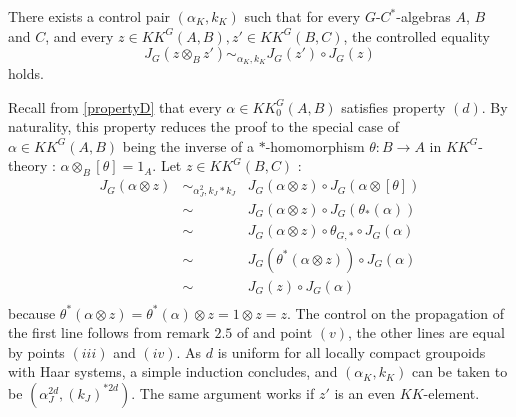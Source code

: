 \begin{prop} There exists a control pair $(\alpha_K,k_K)$ such that for every $G$-$C^*$-algebras $A$, $B$ and $C$, and every $z\in KK^G(A,B),z'\in KK^G(B,C)$, the controlled equality
\[J_G(z\otimes_B z') \sim_{\alpha_K,k_K} J_G(z')\circ J_G(z)\]
holds.
\end{prop}
\begin{dem}
Recall from \ref{propertyD} that every $\alpha\in KK_0^G(A,B)$ satisfies property $(d)$. By naturality, this property reduces the proof to the special case of $\alpha\in KK^G(A,B)$ being the inverse of a $*$-homomorphism $\theta : B\rightarrow A$ in $KK^G$-theory : $\alpha\otimes_B [\theta]=1_A$. Let $z\in KK^G(B,C)$ :
\[\begin{array}{rcl}
J_G (\alpha\otimes z) & \sim_{\alpha_J^2,k_J*k_J} &  J_G(\alpha\otimes z)\circ J_G(\alpha\otimes [\theta]) \\
			& \sim & J_G(\alpha\otimes z)\circ J_G(\theta_*(\alpha))\\
			& \sim & J_G(\alpha\otimes z)\circ \theta_{G,*}\circ J_G(\alpha)\\
			& \sim & J_G(\theta^*(\alpha\otimes z))\circ J_G(\alpha)\\
			& \sim & J_G(z)\circ J_G(\alpha) \\
\end{array}\] 
because $\theta^*(\alpha\otimes z)=\theta^*(\alpha)\otimes z=1\otimes z =z$. The control on the propagation of the first line follows from remark $2.5$ of \cite{OY2} and point $(v)$, the other lines are equal by points $(iii)$ and $(iv)$. As $d$ is uniform for all locally compact groupoids with Haar systems, a simple induction concludes, and $(\alpha_K,k_K)$ can be taken to be $( \alpha_J^{2d},( k_J)^{*2d})$. The same argument works if $z'$ is an even $KK$-element.\\


\end{dem}
